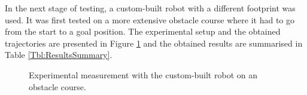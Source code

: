 In the next stage of testing, a custom-built robot with a different footprint was used. It was first tested on a more extensive obstacle course where it had to go from the start to a goal position. The experimental setup and the obtained trajectories are presented in Figure \ref{Fig:paletarTesting} and the obtained results are summarised in Table \ref{Tbl:ResultsSummary}.

\begin{figure}
\centering
{}
\hfill
{}
\caption{Experimental measurement with the custom-built robot on an obstacle course.}
\label{Fig:paletarTesting}
\end{figure}


